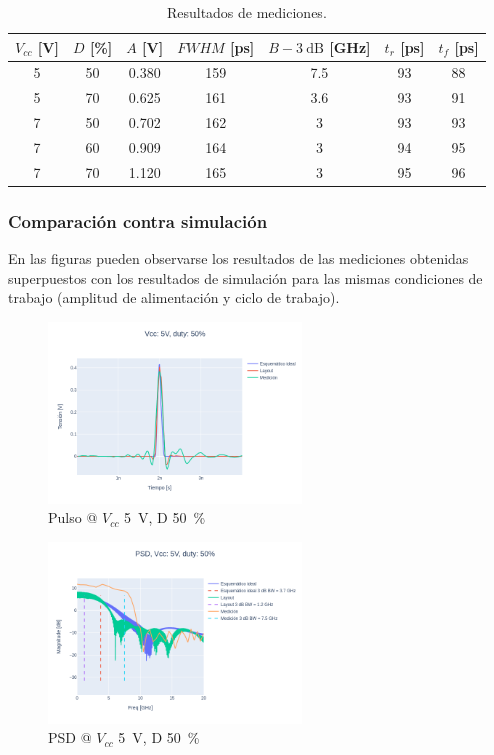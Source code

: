 \begin{table}
\centering
\begin{tabular}{ccccccc}
\hline
$V_{cc}$ [\unit{\volt}] & $D$ [\unit{\percent}] & $A$ [\unit{\volt}] &
    $FWHM$ [\unit{\pico\second}] & $B-\qty{3}{\dB}$ [\unit{\giga\hertz}]& $t_r$
    [\unit{\pico\second}]& $t_f$ [\unit{\pico\second}]\\
\hline
5 & 50 & 0.380 & 159 & 7.5 & 93 & 88 \\
5 & 70 & 0.625 & 161 & 3.6 & 93 & 91 \\
7 & 50 & 0.702 & 162 & 3 & 93 & 93 \\
7 & 60 & 0.909 & 164 & 3 & 94 & 95 \\
7 & 70 & 1.120 & 165 & 3 & 95 & 96 \\
\hline
\end{tabular}
\caption{Resultados de mediciones.}
\label{tab:mediciones_resultados}
\end{table}

\subsubsection{Comparación contra simulación}

En las figuras pueden observarse los resultados de las mediciones obtenidas
superpuestos con los resultados de simulación para las mismas condiciones de
trabajo (amplitud de alimentación y ciclo de trabajo).

\begin{figure}
  \centering
    \includegraphics[width=0.6\textwidth]{images/plots/Vcc_5V_duty_50_time_domain.png}
    \caption{Pulso @ $V_{cc}$ \qty{5}{\volt}, D \qty{50}{\percent} }
    \label{fig:plots_5v_50}
\end{figure}

\begin{figure}
  \centering
    \includegraphics[width=0.6\textwidth]{images/plots/Vcc_5V_duty_50_psd.png}
    \caption{PSD @ $V_{cc}$ \qty{5}{\volt}, D \qty{50}{\percent} }
    \label{fig:psd_5v_50}
\end{figure}

